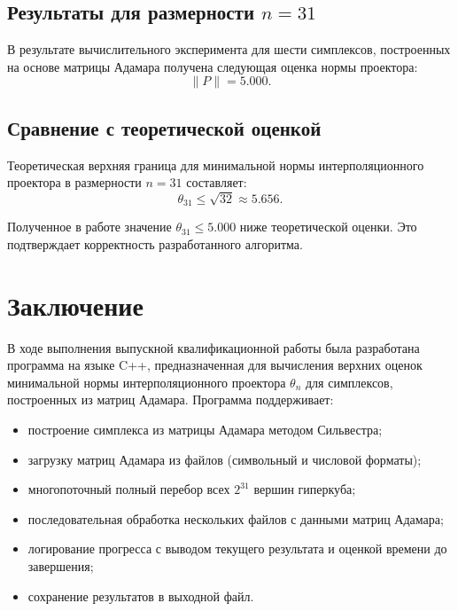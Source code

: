 \documentclass[a4paper,12pt]{article}
\theoremstyle{indented}
\begin{document}
\subsection{Результаты для размерности $n = 31$}

В результате вычислительного эксперимента для шести симплексов, построенных на основе матрицы Адамара получена следующая оценка нормы проектора:
\[
\|P\| = 5.000.
\]

\subsection{Сравнение с теоретической оценкой}

Теоретическая верхняя граница для минимальной нормы интерполяционного проектора в размерности $n = 31$ составляет:
\[
\theta_{31} \le \sqrt{32} \approx 5.656.
\]

Полученное в работе значение $\theta_{31} \le 5.000$ ниже теоретической оценки. Это подтверждает корректность разработанного алгоритма.

\newpage

\section*{Заключение}

В ходе выполнения выпускной квалификационной работы была разработана программа на языке C++, предназначенная для вычисления верхних оценок минимальной нормы интерполяционного проектора $\theta_n$ для симплексов, построенных из матриц Адамара. Программа поддерживает:

\begin{itemize}
    \item построение симплекса из матрицы Адамара методом Сильвестра;
    \item загрузку матриц Адамара из файлов (символьный и числовой форматы);
    \item многопоточный полный перебор всех $2^{31}$ вершин гиперкуба;
    \item последовательная обработка нескольких файлов с данными матриц Адамара;
    \item логирование прогресса с выводом текущего результата и оценкой времени до завершения;
    \item сохранение результатов в выходной файл.
\end{itemize}
\end{document}
